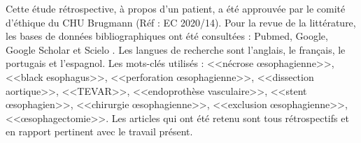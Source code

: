 \documentclass[./tfe.tex]{subfiles}
\begin{document}
Cette étude rétrospective, à propos d’un patient, a été approuvée par le comité d’éthique du CHU Brugmann (Réf : EC 2020/14).
Pour la revue de la littérature, les bases de données bibliographiques ont été consultées : Pubmed, Google, Google Scholar et Scielo . Les langues de recherche sont l’anglais, le français, le portugais et l’espagnol.
Les mots-clés utilisés : <<nécrose œsophagienne>>, <<black esophagus>>, <<perforation œsophagienne>>, <<dissection aortique>>, <<TEVAR>>, <<endoprothèse vasculaire>>, <<stent œsophagien>>, <<chirurgie œsophagienne>>, <<exclusion œsophagienne>>, <<œsophagectomie>>.
Les articles qui ont été retenu sont tous rétrospectifs et en rapport pertinent avec le travail présent.
\end{document}
